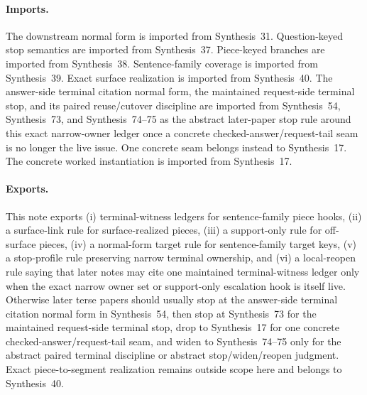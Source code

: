 \documentclass[11pt]{article}
\begin{document}
\paragraph{Imports.}
The downstream normal form is imported from Synthesis~31.\cite{series:downstreamnormalforms}
Question-keyed stop semantics are imported from Synthesis~37.\cite{series:challengestops}
Piece-keyed branches are imported from Synthesis~38.\cite{series:challengebranches}
Sentence-family coverage is imported from Synthesis~39.\cite{series:challengecoverage}
Exact surface realization is imported from Synthesis~40.\cite{series:challengesurfacehooks}
The answer-side terminal citation normal form, the maintained request-side terminal stop, and its paired reuse/cutover discipline are imported from Synthesis~54, Synthesis~73, and Synthesis~74--75 as the abstract later-paper stop rule around this exact narrow-owner ledger once a concrete checked-answer/request-tail seam is no longer the live issue. One concrete seam belongs instead to Synthesis~17.\cite{series:challengeanswerreviewmenus,series:publicrequestresponsepacketrefreshresponsepacketclosureverdicts,series:pairedterminalcitationdiscipline,series:pairedterminalcutoverrules,series:workedexample}
The concrete worked instantiation is imported from Synthesis~17.\cite{series:workedexample}
\paragraph{Exports.}
This note exports (i) terminal-witness ledgers for sentence-family piece hooks, (ii) a surface-link rule for surface-realized pieces, (iii) a support-only rule for off-surface pieces, (iv) a normal-form target rule for sentence-family target keys, (v) a stop-profile rule preserving narrow terminal ownership, and (vi) a local-reopen rule saying that later notes may cite one maintained terminal-witness ledger only when the exact narrow owner set or support-only escalation hook is itself live.
Otherwise later terse papers should usually stop at the answer-side terminal citation normal form in Synthesis~54, then stop at Synthesis~73 for the maintained request-side terminal stop, drop to Synthesis~17 for one concrete checked-answer/request-tail seam, and widen to Synthesis~74--75 only for the abstract paired terminal discipline or abstract stop/widen/reopen judgment. Exact piece-to-segment realization remains outside scope here and belongs to Synthesis~40.\cite{series:challengesurfacehooks,series:challengeanswerreviewmenus,series:publicrequestresponsepacketrefreshresponsepacketclosureverdicts,series:pairedterminalcitationdiscipline,series:pairedterminalcutoverrules,series:workedexample}
\end{document}

